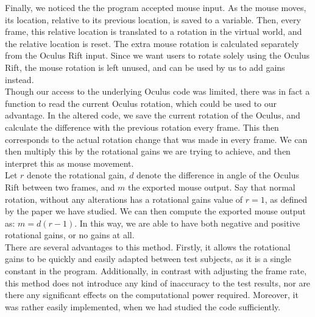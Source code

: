 Finally, we noticed the the program accepted mouse input.
As the mouse moves, its location, relative to its previous location, is saved to a variable.
Then, every frame, this relative location is translated to a rotation in the virtual world, and the relative location is reset.
The extra mouse rotation is calculated separately from the Oculus Rift input.
Since we want users to rotate solely using the Oculus Rift, the mouse rotation is left unused, and can be used by us to add gains instead. \\
Though our access to the underlying Oculus code was limited, there was in fact a function to read the current Oculus rotation, which could be used to our advantage.
In the altered code, we save the current rotation of the Oculus, and calculate the difference with the previous rotation every frame.
This then corresponds to the actual rotation change that was made in every frame.
We can then multiply this by the rotational gains we are trying to achieve, and then interpret this as mouse movement. \\
Let $r$ denote the rotational gain, $d$ denote the difference in angle of the Oculus Rift between two frames, and $m$ the exported mouse output. 
Say that normal rotation, without any alterations has a rotational gains value of $r = 1$, as defined by the paper we have studied.
We can then compute the exported mouse output as: $m = d(r - 1)$.
In this way, we are able to have both negative and positive rotational gains, or no gains at all. \\
There are several advantages to this method.
Firstly, it allows the rotational gains to be quickly and easily adapted between test subjects, as it is a single constant in the program.
Additionally, in contrast with adjusting the frame rate, this method does not introduce any kind of inaccuracy to the test results, nor are there any significant effects on the computational power required.
Moreover, it was rather easily implemented, when we had studied the code sufficiently. \\

